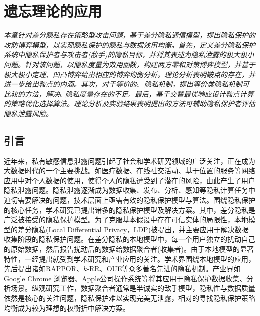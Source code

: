\chapter{遗忘理论的应用}
\label{chapter07}
{\em 本章针对差分隐私存在策略型攻击问题，基于差分隐私通信模型，提出隐私保护的攻防博弈模型，以实现隐私保护的隐私与数据效用均衡。首先，定义差分隐私保护系统中隐私保护者与攻击者(敌手)的隐私目标，并将其表述为隐私泄露的极大极小问题。针对该问题，以隐私度量为效用函数，构建两方零和对策博弈模型，并基于极大极小定理、凹凸博弈给出相应的博弈均衡分析。理论分析表明鞍点的存在，并进一步给出鞍点的内涵。其次，对于等价的$\epsilon$- 隐私机制，提出等价类隐私机制可比较的方法，解决$\epsilon$-隐私度量存在的不足。最后，基于交替最优响应设计鞍点计算的策略优化选择算法。理论分析及实验结果表明提出的方法可辅助隐私保护者评估隐私泄露风险。}
\section{引言}
近年来，私有敏感信息泄露问题引起了社会和学术研究领域的广泛关注，正在成为大数据时代的一个主要挑战。如医疗数据、在线社交活动、基于位置的服务等网络应用中对个人数据的使用，使得个人的隐私遭受到了潜在的风险，由此产生了用户隐私泄露问题。隐私泄露逐渐成为数据收集、发布、分析、感知等隐私计算\cite{Lifenghua16}任务中迫切需要解决的问题，技术层面上亟需有效的隐私保护模型与算法。围绕隐私保护的核心任务，学术研究已提出诸多的隐私保护模型及解决方案。其中，差分隐私\cite{dwork2006differential,dwork2006calibrating,dwork2014algorithmic}是广泛被接受的隐私保护模型。为了克服基本假设中存在可信实体的局限性，本地模型的差分隐私\cite{duchi2013local,duchi2013Minimax}(Local Differential Privacy，LDP)被提出，并主要应用于解决数据收集阶段的隐私保护问题。在差分隐私的本地模型中，每一个用户独立的扰动自己的原始数据，然后报告扰动后的数据给数据聚合者(收集者)。由于本地模型的显著特性，一经提出就受到学术研究和产业应用的关注。学术界围绕本地模型的应用，先后提出诸如RAPPOR\cite{fanti2016building,erlingsson2014rappor}、$k$-RR\cite{kairouz2016extremal}、OUE\cite{wang2017locally}等众多著名先进的隐私机制。产业界如Google Chrome 浏览器\cite{erlingsson2014rappor}、Apple公司操作系统\cite{tang2017privacy}等将其应用于隐私保护数据收集、分析场景。纵观研究工作，数据聚合者通常是半诚实的敌手模型，隐私性与数据质量依然是核心的关注问题，隐私保护难以实现完美无泄露，相对的寻找隐私保护策略均衡成为较为理想的权衡折中解决方案。


